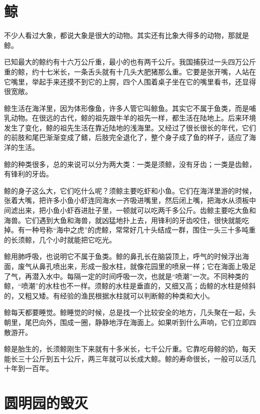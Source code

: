 \documentclass[12pt,UTF-8,openany]{ctexbook}
\begin{document}
\chapter{鲸}

\begin{large}
    
    不少人看过大象，都说大象是很大的动物。其实还有比象大得多的动物，那就是鲸。
    
    已知最大的鲸约有十六万公斤重，最小的也有两千公斤。我国捕获过一头四万公斤重的鲸，约十七米长，一条舌头就有十几头大肥猪那么重。它要是张开嘴，人站在它嘴里，举起手来还摸不到它的上腭，四个人围着桌子坐在它的嘴里看书，还显得很宽敞。
    
    鲸生活在海洋里，因为体形像鱼，许多人管它叫鲸鱼。其实它不属于鱼类，而是哺乳动物。在很远的古代，鲸的祖先跟牛羊的祖先一样，都生活在陆地上。后来环境发生了变化，鲸的祖先生活在靠近陆地的浅海里。又经过了很长很长的年代，它们的前肢和尾巴渐渐变成了鳍，后肢完全退化了，整个身子成了鱼的样子，适应了海洋的生活。
    
    鲸的种类很多，总的来说可以分为两大类：一类是须鲸，没有牙齿；一类是齿鲸，有锋利的牙齿。
    
    鲸的身子这么大，它们吃什么呢？须鲸主要吃虾和小鱼。它们在海洋里游的时候，张着大嘴，把许多小鱼小虾连同海水一齐吸进嘴里，然后闭上嘴，把海水从须板中间滤出来，把小鱼小虾吞进肚子里，一顿就可以吃两千多公斤。齿鲸主要吃大鱼和海兽。它们遇到大鱼和海兽，就凶猛地扑上去，用锋利的牙齿咬住，很快就能吃掉。有一种号称“海中之虎”的虎鲸，常常好几十头结成一群，围住一头三十多吨重的长须鲸，几个小时就能把它吃光。
    
    鲸用肺呼吸，也说明它不属于鱼类。鲸的鼻孔长在脑袋顶上，呼气的时候浮出海面，废气从鼻孔喷出来，形成一股水柱，就像花园里的喷泉一样；它在海面上吸足了气，再潜入水中。每隔一定的时间呼吸一次，也就是“喷潮”一次。不同种类的鲸，“喷潮”的水柱也不一样。须鲸的水柱是垂直的，又细又高；齿鲸的水柱是倾斜的，又粗又矮。有经验的渔民根据水柱就可以判断鲸的种类和大小。
    
    鲸每天都要睡觉。鲸睡觉的时候，总是找一个比较安全的地方，几头聚在一起，头朝里，尾巴向外，围成一圈，静静地浮在海面上。如果听到什么声响，它们立即四散游开。
    
    鲸是胎生的，长须鲸刚生下来就有十多米长，七千公斤重。它靠吃母鲸的奶，每天能长三十公斤到五十公斤，两三年就可以长成大鲸。鲸的寿命很长，一般可以活几十年到一百年。
    
\end{large}



\chapter{圆明园的毁灭}
\end{document}
